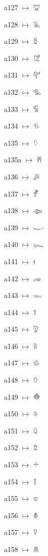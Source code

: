 {\noindent a127 $\mapsto$ {\ahfont 𔒙}\par
\noindent a128 $\mapsto$ {\ahfont 𔒚}\par
\noindent a129 $\mapsto$ {\ahfont 𔒛}\par
\noindent a130 $\mapsto$ {\ahfont 𔒜}\par
\noindent a131 $\mapsto$ {\ahfont 𔒝}\par
\noindent a132 $\mapsto$ {\ahfont 𔒞}\par
\noindent a133 $\mapsto$ {\ahfont 𔒟}\par
\noindent a134 $\mapsto$ {\ahfont 𔒠}\par
\noindent a135 $\mapsto$ {\ahfont 𔒡}\par
\noindent a135a $\mapsto$ {\ahfont 𔒢}\par
\noindent a136 $\mapsto$ {\ahfont 𔒣}\par
\noindent a137 $\mapsto$ {\ahfont 𔒤}\par
\noindent a138 $\mapsto$ {\ahfont 𔒥}\par
\noindent a139 $\mapsto$ {\ahfont 𔒦}\par
\noindent a140 $\mapsto$ {\ahfont 𔒧}\par
\noindent a141 $\mapsto$ {\ahfont 𔒨}\par
\noindent a142 $\mapsto$ {\ahfont 𔒩}\par
\noindent a143 $\mapsto$ {\ahfont 𔒪}\par
\noindent a144 $\mapsto$ {\ahfont 𔒫}\par
\noindent a145 $\mapsto$ {\ahfont 𔒬}\par
\noindent a146 $\mapsto$ {\ahfont 𔒭}\par
\noindent a147 $\mapsto$ {\ahfont 𔒮}\par
\noindent a148 $\mapsto$ {\ahfont 𔒯}\par
\noindent a149 $\mapsto$ {\ahfont 𔒰}\par
\noindent a150 $\mapsto$ {\ahfont 𔒱}\par
\noindent a151 $\mapsto$ {\ahfont 𔒲}\par
\noindent a152 $\mapsto$ {\ahfont 𔒳}\par
\noindent a153 $\mapsto$ {\ahfont 𔒴}\par
\noindent a154 $\mapsto$ {\ahfont 𔒵}\par
\noindent a155 $\mapsto$ {\ahfont 𔒶}\par
\noindent a156 $\mapsto$ {\ahfont 𔒷}\par
\noindent a157 $\mapsto$ {\ahfont 𔒸}\par
\noindent a158 $\mapsto$ {\ahfont 𔒹}\par
}
